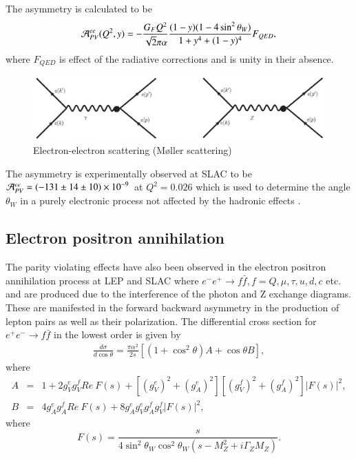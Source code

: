 The asymmetry is calculated to be
\begin{equation}
{\cal A}_{PV}^{ee}(Q^2,y)= -\frac{G_F Q^2}{\sqrt{2}\pi\alpha} \frac{(1-y)(1-4\sin^2\theta_W)}{1+y^4+(1-y)^4} F_{QED}, \label{chap9-eq36}
\end{equation}
where  $F_{QED}$ is effect of the radiative corrections and is unity in their absence. 
\begin{figure}[H]
\centering
\includegraphics[scale=0.35]{src/images/chap9/fig4.jpg}
\caption{Electron-electron scattering (M\o ller scattering)}\label{chap9-fig5}
\end{figure}

The asymmetry is experimentally observed at SLAC to be ${\cal A}_{PV}^{ee}= (-131\pm14\pm10)\times{10}^{-9}$ at $Q^2=0.026$
which is used to determine the angle $\theta_W$ in a purely electronic process not affected by the hadronic effects \cite{chap9-key29}. 

\subsection{Electron positron annihilation}\label{chap9-subsec3.5}

The parity violating effects have also been observed in the electron positron annihilation process at  LEP and SLAC where $e^-e^+\rightarrow f\bar{f}, f=Q,\mu,\tau,u,d,c$ etc. and  are produced due to the interference of the photon and Z exchange diagrams. These are manifested in the forward backward asymmetry in the production of lepton pairs as well as their polarization. The differential cross section for $e^+e^-\rightarrow f\bar{f}$ in the lowest order is given by \cite{chap9-key30}
\begin{eqnarray}
 \frac{d \sigma}{d \cos\theta}=\frac{\pi \alpha^{2}}{2s}\left[ (1+ \cos^2 \theta )A + \cos\theta  B\right],  \label{chap9-eq37}
\end{eqnarray}
where
\begin{eqnarray}
 A&=& 1+2g_{V}^{e}g_{V}^{f}Re~F(s)+[(g_{V}^{e})^2+(g_{A}^{e})^2][(g_{V}^{f})^2+(g_{A}^{f})^2]|F(s)|^2 ,\nonumber \\
 B&=&4g_{A}^{e}g_{A}^{f} Re~F(s)+ 8g_{A}^{e}g_{V}^{e}g_{A}^{f}g_{V}^{f}|F(s)|^2, \label{chap9-eq38}
 \end{eqnarray}
where
\begin{equation}
F(s)=\frac{s}{4\sin^2\theta_{W}\cos^2\theta_{W}(s-M_{Z}^2+i\Gamma_{Z}M_{Z})}. \label{chap9-eq39}
\end{equation}


